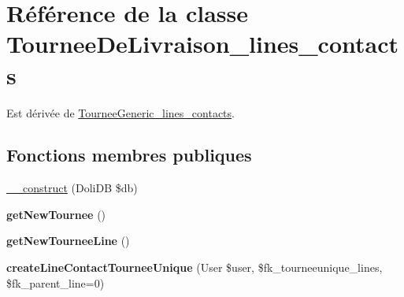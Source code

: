 \hypertarget{classTourneeDeLivraison__lines__contacts}{}\section{Référence de la classe Tournee\+De\+Livraison\+\_\+lines\+\_\+contacts}
\label{classTourneeDeLivraison__lines__contacts}


Est dérivée de \hyperlink{classTourneeGeneric__lines__contacts}{Tournee\+Generic\+\_\+lines\+\_\+contacts}.

\subsection*{Fonctions membres publiques}
\begin{DoxyCompactItemize}
\item 
\hyperlink{classTourneeDeLivraison__lines__contacts_af635e1e913c20a8ed94b77debfb27347}{\+\_\+\+\_\+construct} (Doli\+DB \$db)
\item 
\mbox{\label{classTourneeDeLivraison__lines__contacts_a56a7d677f9f5e90077195af7e54834a1}} 
{\bfseries get\+New\+Tournee} ()
\item 
\mbox{\label{classTourneeDeLivraison__lines__contacts_abf4a74f32d1b11591a161800dacff4e9}} 
{\bfseries get\+New\+Tournee\+Line} ()
\item 
\mbox{\label{classTourneeDeLivraison__lines__contacts_ac85f42448eb30bc99dadaa322bfb89c5}} 
{\bfseries create\+Line\+Contact\+Tournee\+Unique} (User \$user, \$fk\+\_\+tourneeunique\+\_\+lines, \$fk\+\_\+parent\+\_\+line=0)
\end{DoxyCompactItemize}
